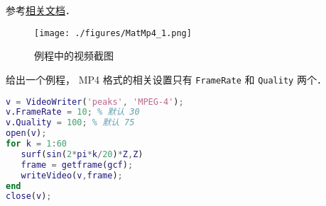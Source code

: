 
\begin{issues}
\issueDraft
\end{issues}


参考\href{https://www.mathworks.com/help/matlab/ref/videowriter.html}{相关文档}．

\begin{figure}[ht]
\centering
\texttt{[image: ./figures/MatMp4\_1.png]}
\caption{例程中的视频截图} \label{MatMp4_fig1}
\end{figure}


给出一个例程， MP4 格式的相关设置只有 \verb|FrameRate| 和 \verb|Quality| 两个．
\begin{lstlisting}[language=matlab]
% 写 mp4 视频
v = VideoWriter('peaks', 'MPEG-4');
v.FrameRate = 10; % 默认 30
v.Quality = 100; % 默认 75
open(v);
for k = 1:60 
   surf(sin(2*pi*k/20)*Z,Z)
   frame = getframe(gcf);
   writeVideo(v,frame);
end
close(v);
\end{lstlisting}
